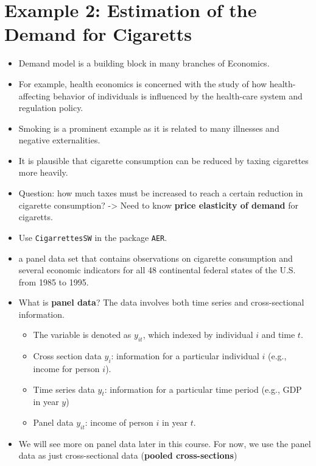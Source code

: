 \documentclass[]{book}
\providecommand{\tightlist}{%
  \setlength{\itemsep}{0pt}\setlength{\parskip}{0pt}}
\begin{document}
\section{Example 2: Estimation of the Demand for
Cigaretts}\label{example-2-estimation-of-the-demand-for-cigaretts}

\begin{itemize}
\item
  Demand model is a building block in many branches of Economics.
\item
  For example, health economics is concerned with the study of how
  health-affecting behavior of individuals is influenced by the
  health-care system and regulation policy.
\item
  Smoking is a prominent example as it is related to many illnesses and
  negative externalities.
\item
  It is plausible that cigarette consumption can be reduced by taxing
  cigarettes more heavily.
\item
  Question: how much taxes must be increased to reach a certain
  reduction in cigarette consumption? -\textgreater{} Need to know
  \textbf{price elasticity of demand} for cigaretts.
\item
  Use \texttt{CigarrettesSW} in the package \texttt{AER}.
\item
  a panel data set that contains observations on cigarette consumption
  and several economic indicators for all 48 continental federal states
  of the U.S. from 1985 to 1995.
\item
  What is \textbf{panel data}? The data involves both time series and
  cross-sectional information.

  \begin{itemize}
  \tightlist
  \item
    The variable is denoted as \(y_{it}\), which indexed by individual
    \(i\) and time \(t\).
  \item
    Cross section data \(y_i\): information for a particular individual
    \(i\) (e.g., income for person \(i\)).
  \item
    Time series data \(y_t\): information for a particular time period
    (e.g., GDP in year \(y\))
  \item
    Panel data \(y_{it}\): income of person \(i\) in year \(t\).
  \end{itemize}
\item
  We will see more on panel data later in this course. For now, we use
  the panel data as just cross-sectional data (\textbf{pooled
  cross-sections})
\end{itemize}
\end{document}
